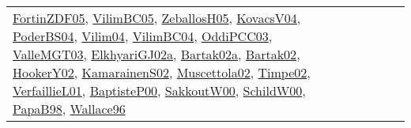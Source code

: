 {\begin{longtable}{lp{3cm}>{\raggedright}p{6cm}>{\raggedright}p{6cm}p{8cm}}
\href{papers/FortinZDF05.pdf}{FortinZDF05}\cite{FortinZDF05}, \href{articles/VilimBC05.pdf}{VilimBC05}\cite{VilimBC05}, \href{articles/ZeballosH05.pdf}{ZeballosH05}\cite{ZeballosH05}, \href{papers/KovacsV04.pdf}{KovacsV04}\cite{KovacsV04}, \href{articles/PoderBS04.pdf}{PoderBS04}\cite{PoderBS04}, \href{papers/Vilim04.pdf}{Vilim04}\cite{Vilim04}, \href{papers/VilimBC04.pdf}{VilimBC04}\cite{VilimBC04}, \href{papers/OddiPCC03.pdf}{OddiPCC03}\cite{OddiPCC03}, \href{papers/ValleMGT03.pdf}{ValleMGT03}\cite{ValleMGT03}, \href{papers/ElkhyariGJ02a.pdf}{ElkhyariGJ02a}\cite{ElkhyariGJ02a}, \href{papers/Bartak02a.pdf}{Bartak02a}\cite{Bartak02a}, \href{papers/Bartak02.pdf}{Bartak02}\cite{Bartak02}, \href{papers/HookerY02.pdf}{HookerY02}\cite{HookerY02}, \href{papers/KamarainenS02.pdf}{KamarainenS02}\cite{KamarainenS02}, \href{papers/Muscettola02.pdf}{Muscettola02}\cite{Muscettola02}, \href{articles/Timpe02.pdf}{Timpe02}\cite{Timpe02}, \href{papers/VerfaillieL01.pdf}{VerfaillieL01}\cite{VerfaillieL01}, \href{articles/BaptisteP00.pdf}{BaptisteP00}\cite{BaptisteP00}, \href{articles/SakkoutW00.pdf}{SakkoutW00}\cite{SakkoutW00}, \href{articles/SchildW00.pdf}{SchildW00}\cite{SchildW00}, \href{articles/PapaB98.pdf}{PapaB98}\cite{PapaB98}, \href{articles/Wallace96.pdf}{Wallace96}\cite{Wallace96}\\

\end{longtable}}
